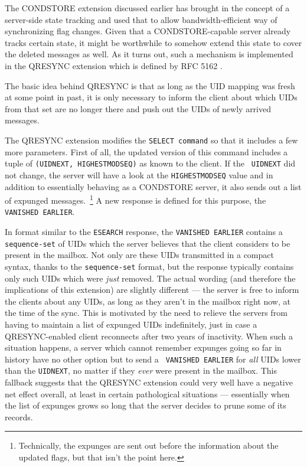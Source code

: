 \documentclass[trojita]{subfiles}
\begin{document}
The CONDSTORE extension discussed earlier has brought in the concept of a server-side state tracking and used that to
allow bandwidth-efficient way of synchronizing flag changes.  Given that a CONDSTORE-capable server already tracks
certain state, it might be worthwhile to somehow extend this state to cover the deleted messages as well.  As it turns
out, such a mechanism is implemented in the QRESYNC extension which is defined by RFC 5162 \cite{rfc5162}.

The basic idea behind QRESYNC is that as long as the UID mapping was fresh at some point in past, it is only necessary
to inform the client about which UIDs from that set are no longer there and push out the UIDs of newly arrived messages.

The QRESYNC extension modifies the {\tt SELECT command} so that it includes a few more parameters.  First of all, the
updated version of this command includes a tuple of {\tt (UIDNEXT, HIGHESTMODSEQ)} as known to the client.  If the {\tt
UIDNEXT} did not change, the server will have a look at the {\tt HIGHESTMODSEQ} value and in addition to essentially
behaving as a CONDSTORE server, it also sends out a list of expunged messages.~\footnote{Technically, the expunges are
sent out before the information about the updated flags, but that isn't the point here.}  A new response is defined for
this purpose, the {\tt VANISHED EARLIER}.

In format similar to the {\tt ESEARCH} response, the {\tt VANISHED EARLIER} contains a {\tt sequence-set} of UIDs which
the server believes that the client considers to be present in the mailbox.  Not only are these UIDs transmitted in a
compact syntax, thanks to the {\tt sequence-set} format, but the response typically contains only such UIDs which were
{\em just} removed.  The actual wording (and therefore the implications of this extension) are slightly different --- the
server is free to inform the clients about any UIDs, as long as they aren't in the mailbox right now, at the time of the
sync.  This is motivated by the need to relieve the servers from having to maintain a list of expunged UIDs
indefinitely, just in case a QRESYNC-enabled client reconnects after two years of inactivity.  When such a situation
happens, a server which cannot remember expunges going so far in history have no other option but to send a {\tt
VANISHED EARLIER} for {\em all} UIDs lower than the {\tt UIDNEXT}, no matter if they {\em ever} were present in the
mailbox.  This fallback suggests that the QRESYNC extension could very well have a negative net effect overall, at least
in certain pathological situations --- essentially when the list of expunges grows so long that the server decides to
prune some of its records.
\end{document}
